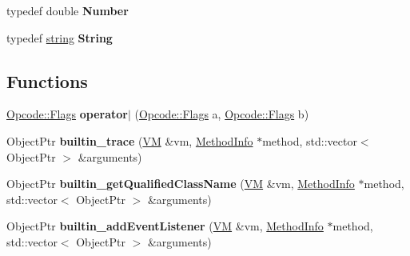 \begin{DoxyCompactItemize}
\item 
\hypertarget{namespacejswf_1_1avm2_a3ad76608fae98b5b6deea9b98dbd232d}{typedef double {\bfseries Number}}\label{namespacejswf_1_1avm2_a3ad76608fae98b5b6deea9b98dbd232d}

\item 
\hypertarget{namespacejswf_1_1avm2_a65203d6fde23d173ac48424cf7579c6b}{typedef \hyperlink{namespacejswf_a755127d61081aa8af105eb800aa2c1ec}{string} {\bfseries String}}\label{namespacejswf_1_1avm2_a65203d6fde23d173ac48424cf7579c6b}

\end{DoxyCompactItemize}
\subsection*{Functions}
\begin{DoxyCompactItemize}
\item 
\hypertarget{namespacejswf_1_1avm2_ad1536db9f912f06791b7835d9707e92c}{\hyperlink{structjswf_1_1avm2_1_1_opcode_a5454d0bfca332ead7135c42d76477e4c}{Opcode\+::\+Flags} {\bfseries operator$\vert$} (\hyperlink{structjswf_1_1avm2_1_1_opcode_a5454d0bfca332ead7135c42d76477e4c}{Opcode\+::\+Flags} a, \hyperlink{structjswf_1_1avm2_1_1_opcode_a5454d0bfca332ead7135c42d76477e4c}{Opcode\+::\+Flags} b)}\label{namespacejswf_1_1avm2_ad1536db9f912f06791b7835d9707e92c}

\item 
\hypertarget{namespacejswf_1_1avm2_a73e2a13ba5638eb8b5f255fae880b10d}{Object\+Ptr {\bfseries builtin\+\_\+trace} (\hyperlink{classjswf_1_1avm2_1_1_v_m}{V\+M} \&vm, \hyperlink{structjswf_1_1avm2_1_1_method_info}{Method\+Info} $\ast$method, std\+::vector$<$ Object\+Ptr $>$ \&arguments)}\label{namespacejswf_1_1avm2_a73e2a13ba5638eb8b5f255fae880b10d}

\item 
\hypertarget{namespacejswf_1_1avm2_a9c8d90794e074a321e8dd89decd14901}{Object\+Ptr {\bfseries builtin\+\_\+get\+Qualified\+Class\+Name} (\hyperlink{classjswf_1_1avm2_1_1_v_m}{V\+M} \&vm, \hyperlink{structjswf_1_1avm2_1_1_method_info}{Method\+Info} $\ast$method, std\+::vector$<$ Object\+Ptr $>$ \&arguments)}\label{namespacejswf_1_1avm2_a9c8d90794e074a321e8dd89decd14901}

\item 
\hypertarget{namespacejswf_1_1avm2_af0fbc584652d9170442d081f5c02699c}{Object\+Ptr {\bfseries builtin\+\_\+add\+Event\+Listener} (\hyperlink{classjswf_1_1avm2_1_1_v_m}{V\+M} \&vm, \hyperlink{structjswf_1_1avm2_1_1_method_info}{Method\+Info} $\ast$method, std\+::vector$<$ Object\+Ptr $>$ \&arguments)}\label{namespacejswf_1_1avm2_af0fbc584652d9170442d081f5c02699c}

\end{DoxyCompactItemize}
